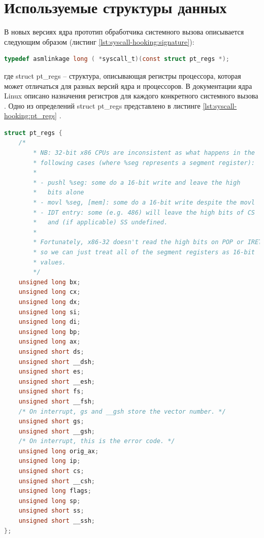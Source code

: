    \section{Используемые структуры данных}
        В новых версиях ядра прототип обработчика системного вызова описывается следующим образом (листинг \ref{lst:syscall-hooking:signature}):
        \begin{lstlisting}[language=C, label=lst:syscall-hooking:signature, title=Прототип обработчиков системных вызовов]
typedef asmlinkage long ( *syscall_t)(const struct pt_regs *);
    \end{lstlisting}
        где struct pt\_regs -- структура, описывающая 
        регистры процессора, которая может отличаться для разных версий ядра и процессоров.
        В документации ядра Linux описано назначения регистров для каждого конкретного системного вызова \cite{linux-syscall-reference}.
        Одно из определений struct pt\_regs представлено в листинге \ref{lst:syscall-hooking:pt_regs} \cite{linux-pt_regs}.

    \begin{lstlisting}[language=C, label=lst:syscall-hooking:pt_regs, title=Структура регистров]
struct pt_regs {
    /*
        * NB: 32-bit x86 CPUs are inconsistent as what happens in the
        * following cases (where %seg represents a segment register):
        *
        * - pushl %seg: some do a 16-bit write and leave the high
        *   bits alone
        * - movl %seg, [mem]: some do a 16-bit write despite the movl
        * - IDT entry: some (e.g. 486) will leave the high bits of CS
        *   and (if applicable) SS undefined.
        *
        * Fortunately, x86-32 doesn't read the high bits on POP or IRET,
        * so we can just treat all of the segment registers as 16-bit
        * values.
        */
    unsigned long bx;
    unsigned long cx;
    unsigned long dx;
    unsigned long si;
    unsigned long di;
    unsigned long bp;
    unsigned long ax;
    unsigned short ds;
    unsigned short __dsh;
    unsigned short es;
    unsigned short __esh;
    unsigned short fs;
    unsigned short __fsh;
    /* On interrupt, gs and __gsh store the vector number. */
    unsigned short gs;
    unsigned short __gsh;
    /* On interrupt, this is the error code. */
    unsigned long orig_ax;
    unsigned long ip;
    unsigned short cs;
    unsigned short __csh;
    unsigned long flags;
    unsigned long sp;
    unsigned short ss;
    unsigned short __ssh;
};
    \end{lstlisting}

